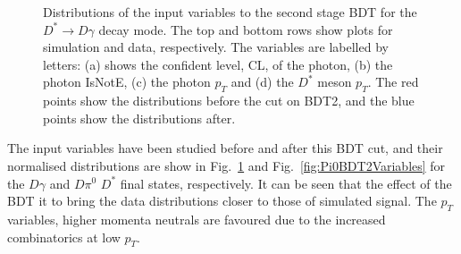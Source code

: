 \documentclass[oneside,12pt]{article}
\begin{document}
\begin{figure}[H]
\caption{\small{Distributions of the input variables to the second stage BDT for
the $D^* \rightarrow D\gamma$ decay mode. The top and bottom rows show plots for
simulation and data, respectively. The variables are labelled by letters: (a)
shows the confident level, CL, of the photon, (b) the photon IsNotE, (c) the
photon $p_T$ and (d) the $D^*$ meson $p_T$. The red points show the
distributions before the cut on BDT2, and the blue points show the distributions
after.}} \label{fig:GammaBDT2Variables}
\end{figure}

The input variables have been studied before and after this BDT cut, and their
normalised distributions are show in Fig.~\ref{fig:GammaBDT2Variables} and
Fig.~\ref{fig:Pi0BDT2Variables} for the $D\gamma$ and $D\pi^0$ $D^*$ final
states, respectively. It can be seen that the effect of the BDT it to bring the
data distributions closer to those of simulated signal.  The $p_T$ variables,
higher momenta neutrals are favoured due to the increased combinatorics at low
$p_T$.
\end{document}
